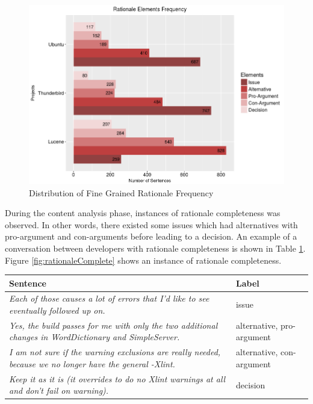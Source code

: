 \documentclass[a4paper,12pt,twoside]{report}
\begin{document}
\begin{figure}[!htbp] %
    \centering
    \includegraphics[width=12cm]{multi-distro-rationale}
    \caption{Distribution of Fine Grained Rationale Frequency}
    \label{fig:distroMultiRationale}
\end{figure}
\noindent \newline
During the content analysis phase, instances of rationale completeness was observed. In other words, there existed some issues which had alternatives with pro-argument and con-arguments before leading to a decision. An example of a conversation between developers with rationale completeness is shown in Table \ref{tab:rationaleExample}. Figure \ref{fig:rationaleComplete} shows an instance of rationale completeness. 
\begin{table} [!htbp]%
    \centering
    \begin{adjustbox}{max width=\columnwidth}
    \def\arraystretch{1} %
    \begin{tabular}{p{10cm} p{5cm}}
        \toprule
        \textbf{Sentence} & \textbf{Label}\\
        \midrule
			\textit{Each of those causes a lot of errors that I'd like to see eventually followed up on.} & issue\\
			\midrule
			\textit{Yes, the build passes for me with only the two additional changes in WordDictionary and SimpleServer.} & alternative, pro-argument \\ 
			\midrule
			\textit{I am not sure if the warning exclusions are really needed, because we no longer have the general -Xlint.} & alternative, con-argument \\ 
			\midrule
			\textit{Keep it as it is (it overrides to do no Xlint warnings at all and don't fail on warning).} & decision \\ 
        \midrule
    \end{tabular}
    \end{adjustbox}
    \label{tab:rationaleExample}
\end{table}
\end{document}
